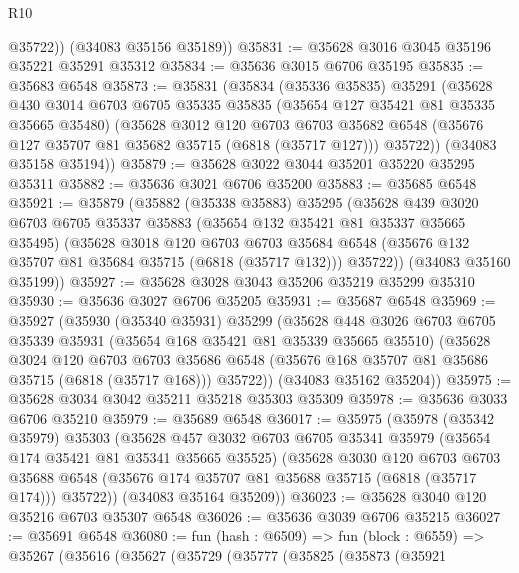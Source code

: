 \begin{lexlean}{R10}
\begin{coremodule}
          @35722))
      (@34083 @35156 @35189))
@35831 := @35628 @3016 @3045 @35196 @35221 @35291 @35312
@35834 := @35636 @3015 @6706 @35195
@35835 := @35683 @6548
@35873 := @35831
    (@35834
      (@35336 @35835)
      @35291
      (@35628
        @430
        @3014
        @6703
        @6705
        @35335
        @35835
        (@35654 @127 @35421 @81 @35335 @35665 @35480)
        (@35628
          @3012
          @120
          @6703
          @6703
          @35682
          @6548
          (@35676 @127 @35707 @81 @35682 @35715 (@6818 (@35717 @127)))
          @35722))
      (@34083 @35158 @35194))
@35879 := @35628 @3022 @3044 @35201 @35220 @35295 @35311
@35882 := @35636 @3021 @6706 @35200
@35883 := @35685 @6548
@35921 := @35879
    (@35882
      (@35338 @35883)
      @35295
      (@35628
        @439
        @3020
        @6703
        @6705
        @35337
        @35883
        (@35654 @132 @35421 @81 @35337 @35665 @35495)
        (@35628
          @3018
          @120
          @6703
          @6703
          @35684
          @6548
          (@35676 @132 @35707 @81 @35684 @35715 (@6818 (@35717 @132)))
          @35722))
      (@34083 @35160 @35199))
@35927 := @35628 @3028 @3043 @35206 @35219 @35299 @35310
@35930 := @35636 @3027 @6706 @35205
@35931 := @35687 @6548
@35969 := @35927
    (@35930
      (@35340 @35931)
      @35299
      (@35628
        @448
        @3026
        @6703
        @6705
        @35339
        @35931
        (@35654 @168 @35421 @81 @35339 @35665 @35510)
        (@35628
          @3024
          @120
          @6703
          @6703
          @35686
          @6548
          (@35676 @168 @35707 @81 @35686 @35715 (@6818 (@35717 @168)))
          @35722))
      (@34083 @35162 @35204))
@35975 := @35628 @3034 @3042 @35211 @35218 @35303 @35309
@35978 := @35636 @3033 @6706 @35210
@35979 := @35689 @6548
@36017 := @35975
    (@35978
      (@35342 @35979)
      @35303
      (@35628
        @457
        @3032
        @6703
        @6705
        @35341
        @35979
        (@35654 @174 @35421 @81 @35341 @35665 @35525)
        (@35628
          @3030
          @120
          @6703
          @6703
          @35688
          @6548
          (@35676 @174 @35707 @81 @35688 @35715 (@6818 (@35717 @174)))
          @35722))
      (@34083 @35164 @35209))
@36023 := @35628 @3040 @120 @35216 @6703 @35307 @6548
@36026 := @35636 @3039 @6706 @35215
@36027 := @35691 @6548
@36080 := fun (hash : @6509) =>
  fun (block : @6559) =>
  @35267
    (@35616
      (@35627
        (@35729
          (@35777
            (@35825
              (@35873
                (@35921

\end{coremodule}
\end{lexlean}
